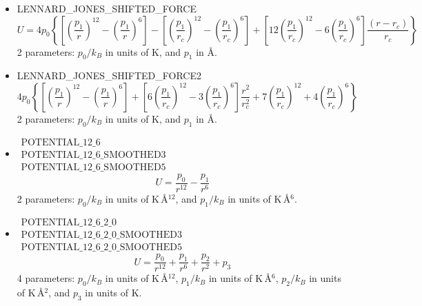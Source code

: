 \begin{itemize}
  \item{LENNARD\_JONES\_SHIFTED\_FORCE}\\
  \begin{equation}
       U=4 p_0 \left\{\left[\left(\frac{p_1}{r}\right)^{12}-\left(\frac{p_1}{r}\right)^6\right]-
           \left[\left(\frac{p_1}{r_c}\right)^{12}-\left(\frac{p_1}{r_c}\right)^6\right]+
           \left[12\left(\frac{p_1}{r_c}\right)^{12}-6\left(\frac{p_1}{r_c}\right)^{6}\right]\frac{\left(r-r_c\right)}{r_c}\right\}
  \end{equation}
  2 parameters: $p_0/k_B$ in units of K, and $p_1$ in \AA.

  \item{LENNARD\_JONES\_SHIFTED\_FORCE2}\\
  \begin{equation}
       4 p_0 \left\{\left[\left(\frac{p_1}{r}\right)^{12}-\left(\frac{p_1}{r}\right)^6\right]
       +\left[6\left(\frac{p_1}{r_c}\right)^{12}-3\left(\frac{p_1}{r_c}\right)^6\right]\frac{r^2}{r_c^2}
       +7\left(\frac{p_1}{r_c}\right)^{12}+4\left(\frac{p_1}{r_c}\right)^6\right\}
  \end{equation}
  2 parameters: $p_0/k_B$ in units of K, and $p_1$ in \AA.

\item{$\begin{array}{l}\text{POTENTIAL\_12\_6}\\
      \text{POTENTIAL\_12\_6\_SMOOTHED3}\\
      \text{POTENTIAL\_12\_6\_SMOOTHED5}\end{array}$}\\
  \begin{equation}
    U= 
      \frac{p_0}{r^{12}}-\frac{p_1}{r^6}
  \end{equation}
   2 parameters: $p_0/k_B$ in units of K\,\AA$^{12}$, and $p_1/k_B$ in units of K\,\AA$^6$.

\item{$\begin{array}{l}\text{POTENTIAL\_12\_6\_2\_0}\\
      \text{POTENTIAL\_12\_6\_2\_0\_SMOOTHED3}\\
      \text{POTENTIAL\_12\_6\_2\_0\_SMOOTHED5}\end{array}$}\\
  \begin{equation}
    U= 
      \frac{p_0}{r^{12}}+\frac{p_1}{r^6}+\frac{p_2}{r^2}+p_3
  \end{equation}
   4 parameters: $p_0/k_B$ in units of K\,\AA$^{12}$, $p_1/k_B$ in units of K\,\AA$^6$, $p_2/k_B$ in units of K\,\AA$^2$, 
   and $p_3$ in units of K.


\end{itemize}

